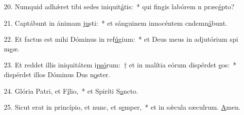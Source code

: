 20. Numquid adhǽret tibi sedes iniquit\uline{á}tis:~* qui fingis labórem n præc\uline{é}pto?\par 
21. Captábunt in ánimam j\uline{u}sti:~* et sánguinem innocéntem cndemn\uline{á}bunt.\par 
22. Et factus est mihi Dóminus in ref\uline{ú}gium:~* et Deus meus in adjutórium spi m\uline{e}æ.\par 
23. Et reddet illis iniquitátem i\uline{psó}rum:~† et in malítia eórum dispérdet \uline{e}os:~* dispérdet illos Dóminus Dus n\uline{o}ster.\par 
24. Glória Patri, et F\uline{í}lio,~* et Spiríti S\uline{a}ncto.\par 
25. Sicut erat in princípio, et nunc, et s\uline{e}mper,~* et in sǽcula sæculrum. \uline{A}men.\par 

